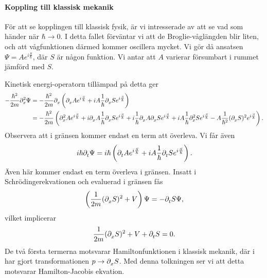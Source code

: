 \paragraph{Koppling till klassisk mekanik}
För att se kopplingen till klassisk fysik, är vi intresserade av att se vad som händer när $\hbar\to 0$. I detta fallet förväntar vi att de Broglie-våglängden blir liten, och att vågfunktionen därmed kommer oscillera mycket. Vi gör då ansatsen $\Psi = Ae^{i\frac{S}{\hbar}}$, där $S$ är någon funktion. Vi antar att $A$ varierar försumbart i rummet jämförd med $S$.

Kinetisk energi-operatorn tillämpad på detta ger
\begin{align*}
	-\frac{\hbar^{2}}{2m}\del[2]{x}{\Psi} &= -\frac{\hbar^{2}}{2m}\del{x}{\left(\del{x}{A}e^{i\frac{S}{\hbar}} + iA\frac{1}{\hbar}\del{x}{S}e^{i\frac{S}{\hbar}}\right)} \\
	                                      &=  -\frac{\hbar^{2}}{2m}\left(\del[2]{x}{A}e^{i\frac{S}{\hbar}} + i\del{x}{A}\frac{1}{\hbar}\del{x}{S}e^{i\frac{S}{\hbar}} + i\frac{1}{\hbar}\del{x}{A}\del{x}{S}e^{i\frac{S}{\hbar}} + iA\frac{1}{\hbar}\del[2]{x}{S}e^{i\frac{S}{\hbar}} - A\frac{1}{\hbar^{2}}(\del{x}{S})^{2}e^{i\frac{S}{\hbar}}\right).
\end{align*}
Observera att i gränsen kommer endast en term att överleva. Vi får även
\begin{align*}
	i\hbar\del{t}{\Psi} = i\hbar\left(\del{t}{A}e^{i\frac{S}{\hbar}} + iA\frac{1}{\hbar}\del{t}{S}e^{i\frac{S}{\hbar}}\right).
\end{align*}
Även här kommer endast en term överleva i gränsen. Insatt i Schrödingerekvationen och evaluerad i gränsen fås
\begin{align*}
	\left(\frac{1}{2m}(\del{x}{S})^{2} + V\right)\Psi = -\del{t}{S}\Psi,
\end{align*}
vilket implicerar
\begin{align*}
	\frac{1}{2m}(\del{x}{S})^{2} + V + \del{t}{S} = 0.
\end{align*}
De två första termerna motsvarar Hamiltonfunktionen i klassisk mekanik, där i har gjort transformationen $p\to\del{x}{S}$. Med denna tolkningen ser vi att detta motsvarar Hamilton-Jacobis ekvation.

